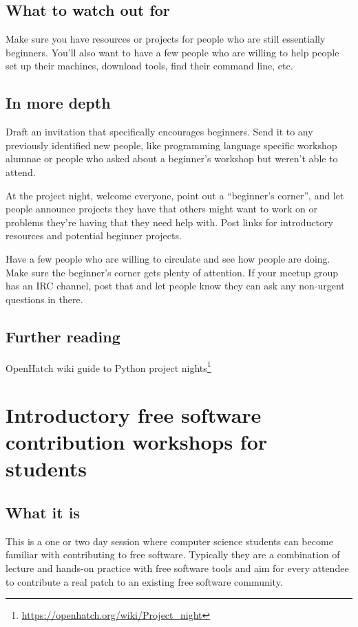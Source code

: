 \subsection{What to watch out for}
Make sure you have resources or projects for people who are still essentially beginners. You’ll also want to have a few people who are willing to help people set up their machines, download tools, find their command line, etc. 

\subsection{In more depth}
Draft an invitation that specifically encourages beginners. Send it to any previously identified new people, like programming language specific workshop alumnae or people who asked about a beginner’s workshop but weren’t able to attend. 

At the project night, welcome everyone, point out a “beginner’s corner”, and let people announce projects they have that others might want to work on or problems they’re having that they need help with. Post links for introductory resources and potential beginner projects.

Have a few people who are willing to circulate and see how people are doing. Make sure the beginner’s corner gets plenty of attention. If your meetup group has an IRC channel, post that and let people know they can ask any non-urgent questions in there.  

\subsection{Further reading}
OpenHatch wiki guide to Python project nights\footnote{\url{https://openhatch.org/wiki/Project_night}}

\section{Introductory free software contribution workshops for students}
\subsection{What it is}
This is a one or two day session where computer science students can become familiar with contributing to free software. Typically they are a combination of lecture and hands-on practice with free software tools and aim for every attendee to contribute a real patch to an existing free software community.

